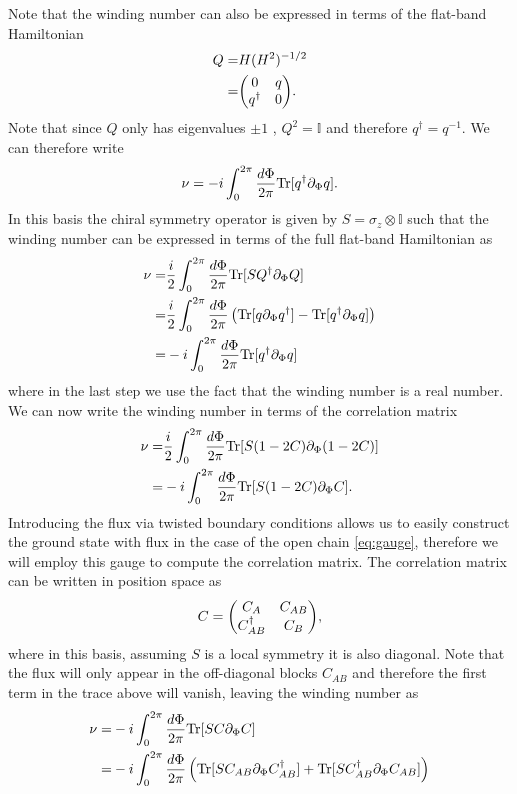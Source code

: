 \documentclass[twocolumn,amsmath,longbibliography,amssymb,superscriptaddress]{revtex4-1}
\begin{document}
Note that the winding number can also be expressed in terms of the flat-band Hamiltonian
\begin{align*}
Q =& H (H^2)^{-1/2} \\
=& \mqty(0 & q \\ q^\dagger & 0).
\end{align*}
Note that since $Q$ only has eigenvalues $\pm 1 $ , $Q^2 = \mathbb{I}$ and therefore $q^\dagger = q^{-1}$. We can therefore write
\begin{equation}
\nu = -i\int_0^{2\pi} \frac{d\Phi}{2\pi} {\rm Tr}[q^\dagger \partial_\Phi q].
\end{equation}
In this basis the chiral symmetry operator is given by $S = \sigma_z \otimes \mathbb{I}$ such that the winding number can be expressed in terms of the full flat-band Hamiltonian as
\begin{align}
\nu =& \frac{i}{2}\int_0^{2\pi} \frac{d\Phi}{2\pi} {\rm Tr}[S Q^\dagger \partial_\Phi Q] \\
=& \frac{i}{2}\int_0^{2\pi} \frac{d\Phi}{2\pi} \left({\rm Tr}[q \partial_\Phi q^\dagger]-{\rm Tr}[q^\dagger \partial_\Phi q] \right)\\
=& -i\int_0^{2\pi} \frac{d\Phi}{2\pi} {\rm Tr}[q^\dagger \partial_\Phi q] 
\end{align}
where in the last step we use the fact that the winding number is a real number. We can now write the winding number in terms of the correlation matrix
\begin{align}
\nu =& \frac{i}{2}\int_0^{2\pi} \frac{d\Phi}{2\pi} {\rm Tr}[S (1-2C) \partial_\Phi (1-2C)] \\
=& -i\int_0^{2\pi} \frac{d\Phi}{2\pi} {\rm Tr}[S (1-2C) \partial_\Phi C] .
\end{align}
Introducing the flux via twisted boundary conditions allows us to easily construct the ground state with flux in the case of the open chain \eqref{eq:gauge}, therefore we will employ this gauge to compute the correlation matrix. The correlation matrix can be written in position space as
\begin{equation}
C = \mqty(C_A & C_{AB} \\ C_{AB}^\dagger & C_B),
\end{equation}
where in this basis, assuming $S$ is a local symmetry it is also diagonal. Note that the flux will only appear in the off-diagonal blocks $C_{AB}$ and therefore the first term in the trace above will vanish, leaving the winding number as
\begin{align}
\nu =&  -i\int_0^{2\pi} \frac{d\Phi}{2\pi} {\rm Tr}[S C \partial_\Phi C] \\
=&  -i\int_0^{2\pi} \frac{d\Phi}{2\pi} \left( {\rm Tr}[S C_{AB} \partial_\Phi C_{AB}^\dagger]+{\rm Tr}[S C_{AB}^\dagger \partial_\Phi C_{AB}] \right)
\end{align}
\end{document}
